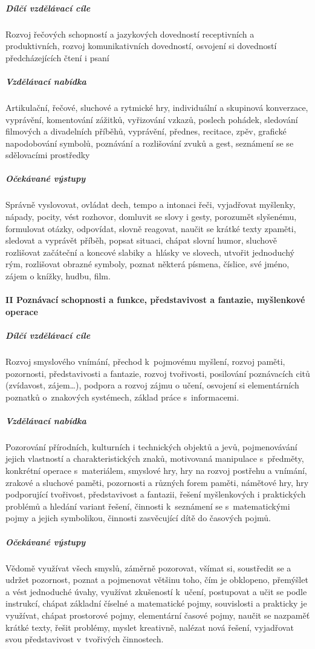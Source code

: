 					\subparagraph{Dílčí vzdělávací cíle}
						Rozvoj řečových schopností a jazykových dovedností receptivních a produktivních, rozvoj komunikativních dovedností, osvojení si dovedností předcházejících čtení i psaní
					\subparagraph{Vzdělávací nabídka}
						Artikulační, řečové, sluchové a rytmické hry, individuální a skupinová konverzace, vyprávění, komentování zážitků, vyřizování vzkazů, poslech pohádek, sledování filmových a divadelních příběhů, vyprávění, přednes, recitace, zpěv, grafické napodobování symbolů, poznávání a rozlišování zvuků a gest, seznámení se se sdělovacími prostředky
					\subparagraph{Očekávané výstupy}
						Správně vyslovovat, ovládat dech, tempo a intonaci řeči, vyjadřovat myšlenky, nápady, pocity, vést rozhovor, domluvit se slovy i gesty, porozumět slyšenému, formulovat otázky, odpovídat, slovně reagovat, naučit se krátké texty zpaměti, sledovat a vyprávět příběh, popsat situaci, chápat slovní humor, sluchově rozlišovat začáteční a koncové slabiky a hlásky ve slovech, utvořit jednoduchý rým, rozlišovat obrazné symboly, poznat některá písmena, číslice, své jméno, zájem o knížky, hudbu, film.

				\paragraph{II Poznávací schopnosti a funkce, představivost a fantazie, myšlenkové operace}

					\subparagraph{Dílčí vzdělávací cíle}
						Rozvoj smyslového vnímání, přechod k pojmovému myšlení, rozvoj paměti, pozornosti, představivosti a fantazie, rozvoj tvořivosti, posilování poznávacích citů (zvídavost, zájem…), podpora a rozvoj zájmu o učení, osvojení si elementárních poznatků o znakových systémech, základ práce s informacemi.
					\subparagraph{Vzdělávací nabídka}
						Pozorování přírodních, kulturních i technických objektů a jevů, pojmenovávání jejich vlastností a charakteristických znaků, motivovaná manipulace s předměty, konkrétní operace s materiálem, smyslové hry, hry na rozvoj postřehu a vnímání, zrakové a sluchové paměti, pozornosti a různých forem paměti, námětové hry, hry podporující tvořivost, představivost a fantazii, řešení myšlenkových i praktických problémů a hledání variant řešení, činnosti k seznámení se s matematickými pojmy a jejich symbolikou, činnosti zasvěcující dítě do časových pojmů.
					\subparagraph{Očekávané výstupy}
						Vědomě využívat všech smyslů, záměrně pozorovat, všímat si, soustředit se a udržet pozornost, poznat a pojmenovat většinu toho, čím je obklopeno, přemýšlet a vést jednoduché úvahy, využívat zkušeností k učení, postupovat a učit se podle instrukcí, chápat základní číselné a matematické pojmy, souvislosti a prakticky je využívat, chápat prostorové pojmy, elementární časové pojmy, naučit se nazpaměť krátké texty, řešit problémy, myslet kreativně, nalézat nová řešení, vyjadřovat svou představivost v tvořivých činnostech.

